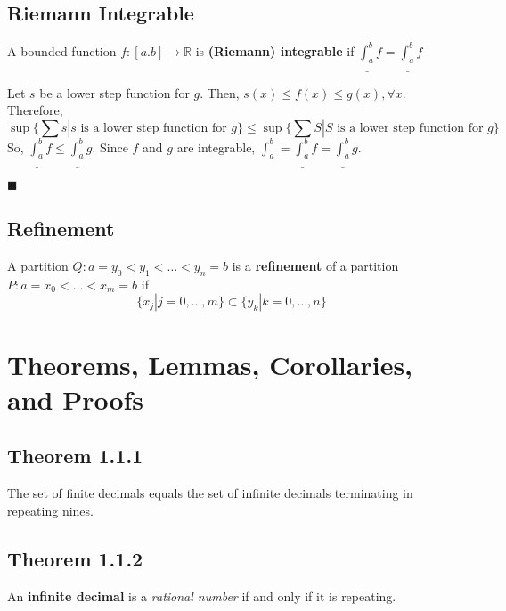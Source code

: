 \documentclass[11pt]{book}
\newcommand{\R}{\mathbb{R}}
\newcommand{\QED}{\begin{flushright}$\blacksquare$\end{flushright}}
\begin{document}
	\subsection{Riemann Integrable}
	\label{subsec:riemannintegrable}
		\begin{defin}
			A bounded function $f:[a.b] \to \R$ is \textbf{(Riemann) integrable} if $\underline{\int_a^b}{f} = \underline{\int_a^b}{f}$
		\end{defin}
		\begin{examp}
			Let $s$ be a lower step function for $g$. Then, $s(x) \leq f(x) \leq g(x), \forall x$. Therefore, 
			$$\sup\{\sum s | s \text{ is a lower step function for } g \} \leq \sup\{\sum S | S \text{ is a lower step function for } g \}$$
			So, $\underline{\int_a^b}{f} \leq \underline{\int_a^b}{g}$. Since $f$ and $g$ are integrable, $\int_a^b = \underline{\int_a^b}{f} = \underline{\int_a^b}{g}$.
			\QED
		\end{examp}

	\subsection{Refinement}
	\label{subsec:refinement}
		\begin{defin}
			A partition $Q: a = y_0 < y_1 < \dots < y_n = b$ is a \textbf{refinement} of a partition $P: a = x_0 < \dots < x_m = b$ if 
			$$\{x_j | j = 0,\dots,m \} \subset \{y_k | k = 0,\dots,n\}$$
		\end{defin}

\section{Theorems, Lemmas, Corollaries, and Proofs}
	\subsection{Theorem 1.1.1}
		\begin{theor} 
			The set of finite decimals equals the set of infinite decimals terminating in repeating nines.
		\end{theor}
	\subsection{Theorem 1.1.2}
		\begin{theor}
			An \textbf{infinite decimal} is a \emph{rational number} if and only if it is repeating.
		\end{theor}
\end{document}
